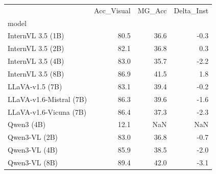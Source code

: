 \begin{tabular}{lrrr}
\toprule
 & Acc_Visual & MG_Acc & Delta_Inst \\
model &  &  &  \\
\midrule
InternVL 3.5 (1B) & 80.5 & 36.6 & -0.3 \\
InternVL 3.5 (2B) & 82.1 & 36.8 & 0.3 \\
InternVL 3.5 (4B) & 83.0 & 35.7 & -2.2 \\
InternVL 3.5 (8B) & 86.9 & 41.5 & 1.8 \\
LLaVA-v1.5 (7B) & 83.1 & 39.4 & -0.2 \\
LLaVA-v1.6-Mistral (7B) & 86.3 & 39.6 & -1.6 \\
LLaVA-v1.6-Vicuna (7B) & 86.4 & 37.3 & -2.3 \\
Qwen3 (4B) & 12.1 & NaN & NaN \\
Qwen3-VL (2B) & 83.0 & 36.8 & -0.7 \\
Qwen3-VL (4B) & 85.9 & 38.5 & -2.0 \\
Qwen3-VL (8B) & 89.4 & 42.0 & -3.1 \\
\bottomrule
\end{tabular}
